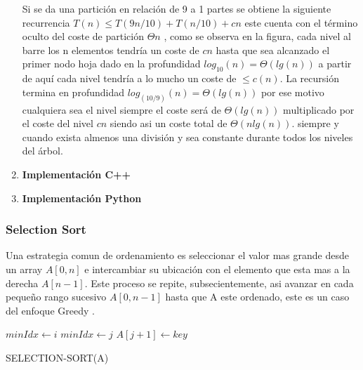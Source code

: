 \documentclass{article}
\begin{document}
\begin{enumerate}
                            Si se da una partici\'{o}n en relaci\'{o}n de 9 a 1 partes se obtiene la siguiente recurrencia $T(n) \leq T(9n/10) + T(n/10) + cn $ este cuenta con el t\'{e}rmino oculto del coste de partici\'{o}n $\Theta n$ , como se observa en la figura, cada nivel al barre los n elementos tendr\'{i}a un coste de $cn$ hasta que sea alcanzado el primer nodo hoja dado en la profundidad $log_10(n) = \Theta(lg(n))$ a partir de aqu\'{i} cada nivel tendr\'{i}a a lo mucho un coste de $\leq c(n)$. La recursi\'{o}n termina en profundidad $log_(10/9)(n) = \Theta(lg(n))$ por ese motivo cualquiera sea el nivel siempre el coste ser\'{a} de $\Theta(lg(n))$ multiplicado por el coste del nivel $cn$ siendo asi un coste total de $\Theta(nlg(n))$. siempre y cuando exista almenos una divisi\'{o}n y sea constante durante todos los niveles del \'{a}rbol.
                            
                        \item \textbf{Implementaci\'{o}n C++}
                    
                            
                            
                        \item \textbf{Implementaci\'{o}n Python}\\
                    
                            
                    \end{enumerate}
                    
		         
		         \subsubsection{Selection Sort}
		            Una estrategia comun de ordenamiento es seleccionar el valor mas grande desde un array $A[0,n]$ e intercambiar su ubicación con el elemento que esta mas a la derecha $A[n-1]$. Este proceso se repite, subsecientemente, asi avanzar en cada pequeño rango sucesivo $A[0,n-1]$ hasta que A este ordenado, este es un caso del enfoque Greedy \cite{Heineman2008}.
		            
		            \begin{algorithm}[H]
                        \begin{algorithmic}[1]
                                \STATE $minIdx \gets i$
                                        \STATE $minIdx \gets j$ 
                                    \ENDIF
                                \ENDFOR
                                \STATE $A[j + 1] \gets key$
                            \ENDFOR
                        \end{algorithmic}
                        \caption{SELECTION-SORT(A)}
                        \label{alg:selection-sort}
                    \end{algorithm}
		            
\end{document}
